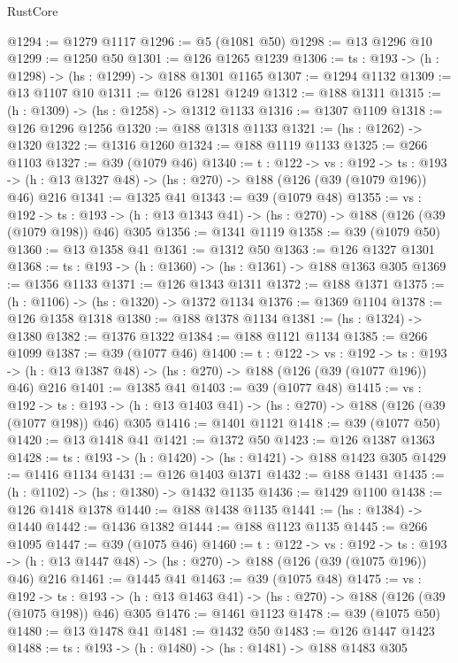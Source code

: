 \begin{lexlean}{RustCore}
\begin{coremodule}
@1294 := @1279 @1117
@1296 := @5 (@1081 @50)
@1298 := @13 @1296 @10
@1299 := @1250 @50
@1301 := @126 @1265 @1239
@1306 := {ts : @193} -> (h : @1298) -> (hs : @1299) -> @188 @1301 @1165
@1307 := @1294 @1132
@1309 := @13 @1107 @10
@1311 := @126 @1281 @1249
@1312 := @188 @1311
@1315 := (h : @1309) -> (hs : @1258) -> @1312 @1133
@1316 := @1307 @1109
@1318 := @126 @1296 @1256
@1320 := @188 @1318 @1133
@1321 := (hs : @1262) -> @1320
@1322 := @1316 @1260
@1324 := @188 @1119 @1133
@1325 := @266 @1103
@1327 := @39 (@1079 @46)
@1340 := {t : @122} ->
  {vs : @192} ->
  {ts : @193} -> (h : @13 @1327 @48) -> (hs : @270) -> @188 (@126 (@39 (@1079 @196)) @46) @216
@1341 := @1325 @41
@1343 := @39 (@1079 @48)
@1355 := {vs : @192} ->
  {ts : @193} -> (h : @13 @1343 @41) -> (hs : @270) -> @188 (@126 (@39 (@1079 @198)) @46) @305
@1356 := @1341 @1119
@1358 := @39 (@1079 @50)
@1360 := @13 @1358 @41
@1361 := @1312 @50
@1363 := @126 @1327 @1301
@1368 := {ts : @193} -> (h : @1360) -> (hs : @1361) -> @188 @1363 @305
@1369 := @1356 @1133
@1371 := @126 @1343 @1311
@1372 := @188 @1371
@1375 := (h : @1106) -> (hs : @1320) -> @1372 @1134
@1376 := @1369 @1104
@1378 := @126 @1358 @1318
@1380 := @188 @1378 @1134
@1381 := (hs : @1324) -> @1380
@1382 := @1376 @1322
@1384 := @188 @1121 @1134
@1385 := @266 @1099
@1387 := @39 (@1077 @46)
@1400 := {t : @122} ->
  {vs : @192} ->
  {ts : @193} -> (h : @13 @1387 @48) -> (hs : @270) -> @188 (@126 (@39 (@1077 @196)) @46) @216
@1401 := @1385 @41
@1403 := @39 (@1077 @48)
@1415 := {vs : @192} ->
  {ts : @193} -> (h : @13 @1403 @41) -> (hs : @270) -> @188 (@126 (@39 (@1077 @198)) @46) @305
@1416 := @1401 @1121
@1418 := @39 (@1077 @50)
@1420 := @13 @1418 @41
@1421 := @1372 @50
@1423 := @126 @1387 @1363
@1428 := {ts : @193} -> (h : @1420) -> (hs : @1421) -> @188 @1423 @305
@1429 := @1416 @1134
@1431 := @126 @1403 @1371
@1432 := @188 @1431
@1435 := (h : @1102) -> (hs : @1380) -> @1432 @1135
@1436 := @1429 @1100
@1438 := @126 @1418 @1378
@1440 := @188 @1438 @1135
@1441 := (hs : @1384) -> @1440
@1442 := @1436 @1382
@1444 := @188 @1123 @1135
@1445 := @266 @1095
@1447 := @39 (@1075 @46)
@1460 := {t : @122} ->
  {vs : @192} ->
  {ts : @193} -> (h : @13 @1447 @48) -> (hs : @270) -> @188 (@126 (@39 (@1075 @196)) @46) @216
@1461 := @1445 @41
@1463 := @39 (@1075 @48)
@1475 := {vs : @192} ->
  {ts : @193} -> (h : @13 @1463 @41) -> (hs : @270) -> @188 (@126 (@39 (@1075 @198)) @46) @305
@1476 := @1461 @1123
@1478 := @39 (@1075 @50)
@1480 := @13 @1478 @41
@1481 := @1432 @50
@1483 := @126 @1447 @1423
@1488 := {ts : @193} -> (h : @1480) -> (hs : @1481) -> @188 @1483 @305

\end{coremodule}
\end{lexlean}
